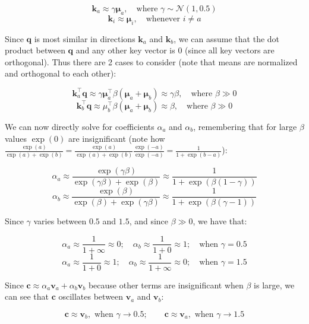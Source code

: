 \begin{parts}
\begin{subparts}
\begin{answer}
    $$\mathbf{k}_a\approx \gamma \mathbf{\mu}_a,\quad \text{where } \gamma\sim\mathcal{N}(1, 0.5)$$
    $$\mathbf{k}_i\approx \mathbf{\mu}_i, \quad \text{whenever } i \ne a$$
    
    Since $\mathbf{q}$ is most similar in directions $\mathbf{k}_a$ and $\mathbf{k}_b$, we can assume that the dot product between $\mathbf{q}$ and any other key vector is $0$ (since all key vectors are orthogonal). Thus there are 2 cases to consider (note that means are normalized and orthogonal to each other):
    
    $$\mathbf{k}_a^{\top}\mathbf{q}\approx \gamma \mathbf{\mu}_a^{\top} \beta(\mathbf{\mu}_a + \mathbf{\mu}_b)\approx \gamma\beta,\quad \text{where }\beta \gg 0$$
    $$\mathbf{k}_b^{\top}\mathbf{q}\approx \mu_b^{\top} \beta(\mathbf{\mu}_a + \mathbf{\mu}_b)\approx \beta,\quad \text{where }\beta \gg 0$$
    
    We can now directly solve for coefficients $\alpha_a$ and $\alpha_b$, remembering that for large $\beta$ values $\exp(0)$ are insignificant (note how $\frac{\exp(a)}{\exp(a)+\exp(b)}=\frac{\exp(a)}{\exp(a)+\exp(b)}\frac{\exp(-a)}{\exp(-a)}=\frac{1}{1+\exp(b-a)}$):
    
    $$\alpha_a\approx\frac{\exp(\gamma\beta)}{\exp(\gamma\beta)+\exp(\beta)}\approx\frac{1}{1+\exp(\beta(1-\gamma))}$$
    $$\alpha_b\approx\frac{\exp(\beta)}{\exp(\beta)+\exp(\gamma\beta)}\approx\frac{1}{1+\exp(\beta(\gamma-1))}$$
    
    Since $\gamma$ varies between $0.5$ and $1.5$, and since $\beta \gg 0$, we have that:
    
    $$\alpha_a\approx\frac{1}{1+\infty}\approx 0;\quad \alpha_b\approx\frac{1}{1+0}\approx 1;\quad\text{when }\gamma=0.5$$
    $$\alpha_a\approx\frac{1}{1+0}\approx 1;\quad \alpha_b\approx\frac{1}{1+\infty}\approx 0;\quad\text{when }\gamma=1.5$$
    
    Since $\mathbf{c}\approx\alpha_a\mathbf{v}_a+\alpha_b\mathbf{v}_b$ because other terms are insignificant when $\beta$ is large, we can see that $\mathbf{c}$ oscillates between $\mathbf{v}_a$ and $\mathbf{v}_b$:
    
    $$\mathbf{c}\approx \mathbf{v}_b, \text{ when }\gamma\to 0.5;\qquad \mathbf{c}\approx \mathbf{v}_a, \text{ when }\gamma\to 1.5$$
\end{answer}
\end{subparts}


\end{parts}
